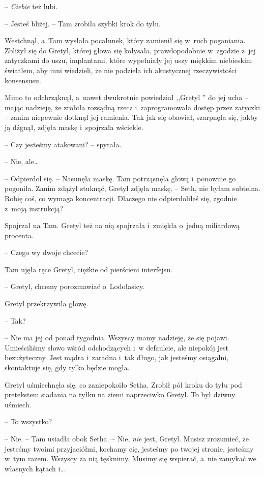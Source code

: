 \documentclass[oneside,polish,11pt,sfheadings]{mwbk}
\begin{document}
-- \textit{Ciebie} też lubi.

-- Jesteś bliżej. -- Tam zrobiła szybki krok do tyłu.

Westchnął, a~Tam wysłała pocałunek, który zamienił się w~ruch
poganiania. Zbliżył się do Gretyl, której głowa się kołysała,
prawdopodobnie w~zgodzie z~jej zatyczkami do uszu, implantami, które
wypełniały jej uszy miękkim niebieskim światłem, aby inni wiedzieli, że
nie podziela ich akustycznej rzeczywistości konsensusu.

Mimo to odchrząknął, a~nawet dwukrotnie powiedział ,,Gretyl '' do jej
ucha -- mając nadzieję, że zrobiła rozsądną rzecz i~zaprogramowała dostęp
przez zatyczki -- zanim niepewnie dotknął jej ramienia. Tak jak się
obawiał, szarpnęła się, jakby ją dźgnął, zdjęła maskę i~spojrzała
wściekle.

-- Czy jesteśmy atakowani? -- spytała.

-- Nie, ale\ldots 

-- Odpierdol się. -- Nasunęła maskę. Tam potrząsnęła głową i~ponownie go
pogoniła. Zanim zdążył stuknąć, Gretyl zdjęła maskę. -- Seth, nie byłam
subtelna. Robię coś, co wymaga koncentracji. Dlaczego nie odpierdoliłeś
się, zgodnie z~moją instrukcją?

Spojrzał na Tam. Gretyl też na nią spojrzała i~zmiękła o~jedną
miliardową procenta.

-- Czego wy dwoje chcecie?

Tam ujęła ręce Gretyl, ciężkie od pierścieni interfejsu. 

-- Gretyl,
chcemy porozmawiać o~Lodołasicy.

Gretyl przekrzywiła głowę. 

-- Tak?

-- Nie ma jej od ponad tygodnia. Wszyscy mamy nadzieję, że się pojawi.
Umieściliśmy słowo wśród odchodzących i~w defaulcie, ale niepokój jest
bezużyteczny. Jest mądra i~zaradna i~tak długo, jak jesteśmy osiągalni,
skontaktuje się, gdy tylko będzie mogła.

Gretyl uśmiechnęła się, co zaniepokoiło Setha. Zrobił pół kroku do tyłu
pod pretekstem siadania na tyłku na ziemi naprzeciwko Gretyl. To był
dziwny uśmiech.

-- To wszystko?

-- Nie. -- Tam usiadła obok Setha. -- Nie, \textit{nie} jest, Gretyl. Musisz
zrozumieć, że jesteśmy twoimi przyjaciółmi, kochamy cię, jesteśmy po
twojej stronie, jesteśmy w~tym razem. Wszyscy za nią tęsknimy. Musimy
się wspierać, a~nie zamykać we własnych kątach i\ldots 
\end{document}
